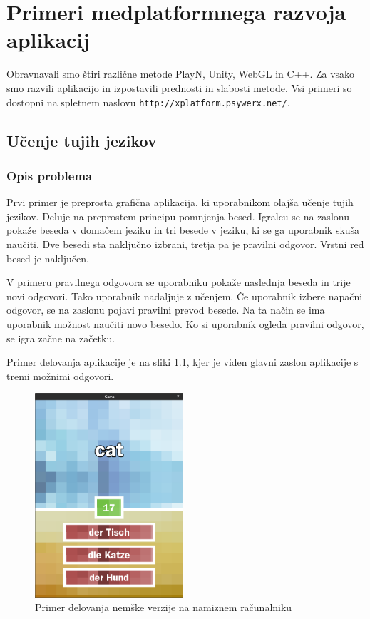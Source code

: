 \chapter{Primeri medplatformnega razvoja aplikacij}

Obravnavali smo štiri različne metode PlayN, Unity, WebGL in C++. Za vsako smo razvili aplikacijo in izpostavili prednosti in slabosti metode. Vsi primeri so dostopni na spletnem naslovu \texttt{http://xplatform.psywerx.net/}.

\section{Učenje tujih jezikov}

\subsection{Opis problema}

Prvi primer je preprosta grafična aplikacija, ki uporabnikom olajša učenje tujih jezikov. Deluje na preprostem principu pomnjenja besed. Igralcu se na zaslonu pokaže beseda v domačem jeziku in tri besede v jeziku, ki se ga uporabnik skuša naučiti. Dve besedi sta naključno izbrani, tretja pa je pravilni odgovor. Vrstni red besed je naključen.

V primeru pravilnega odgovora se uporabniku pokaže naslednja beseda in trije novi odgovori. Tako uporabnik nadaljuje z učenjem. Če uporabnik izbere napačni odgovor, se na zaslonu pojavi pravilni prevod besede. Na ta način se ima uporabnik možnost naučiti novo besedo. Ko si uporabnik ogleda pravilni odgovor, se igra začne na začetku.

Primer delovanja aplikacije je na sliki \ref{german}, kjer je viden glavni zaslon aplikacije s tremi možnimi odgovori.

\begin{figure}
\begin{center}
\includegraphics[width=5.5cm]{pic/defg-german.png}
\end{center}
\caption{Primer delovanja nemške verzije na namiznem računalniku}
\label{german}
\end{figure} 

